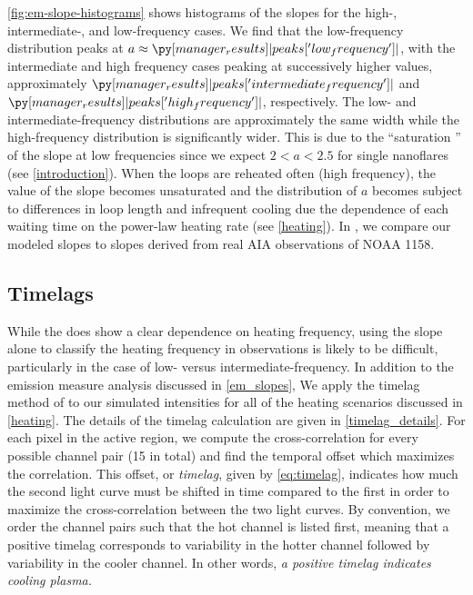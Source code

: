 \autoref{fig:em-slope-histograms} shows histograms of the \dem{} slopes for the high-, intermediate-, and low-frequency cases. We find that the low-frequency distribution peaks at $a\approx\py[manager_results]|peaks['low_frequency']|$, with the intermediate and high frequency cases peaking at successively higher values, approximately $\py[manager_results]|peaks['intermediate_frequency']|$ and $\py[manager_results]|peaks['high_frequency']|$, respectively. The low- and intermediate-frequency distributions are approximately the same width while the high-frequency distribution is significantly wider. This is due to the ``saturation '' of the slope at low frequencies since we expect $2<a<2.5$ for single nanoflares (see \autoref{introduction}). When the loops are reheated often (high frequency), the value of the slope becomes unsaturated and the distribution of $a$ becomes subject to differences in loop length and infrequent cooling due the dependence of each waiting time on the power-law heating rate (see \autoref{heating}). In , we compare our modeled \dem{} slopes to slopes derived from real AIA observations of NOAA 1158.

\subsection{Timelags}\label{timelags}

While the \dem{} does show a clear dependence on heating frequency, using the \dem{} slope alone to classify the heating frequency in observations is likely to be difficult, particularly in the case of low- versus intermediate-frequency. In addition to the emission measure analysis discussed in \autoref{em_slopes}, We apply the timelag method of \citet{viall_evidence_2012} to our simulated intensities for all of the heating scenarios discussed in \autoref{heating}. The details of the timelag calculation are given in \autoref{timelag_details}. For each pixel in the active region, we compute the cross-correlation for every possible channel pair (15 in total) and find the temporal offset which maximizes the correlation. This offset, or \textit{timelag}, given by \autoref{eq:timelag}, indicates how much the second light curve must be shifted in time compared to the first in order to maximize the cross-correlation between the two light curves. By convention, we order the channel pairs such that the hot channel is listed first, meaning that a positive timelag corresponds to variability in the hotter channel followed by variability in the cooler channel. In other words, \textit{a positive timelag indicates cooling plasma.}

